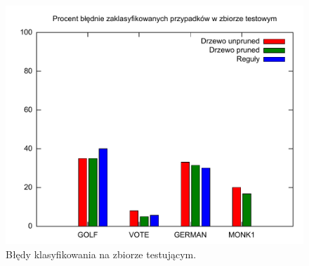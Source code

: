 \begin{figure}[hth]
	\includegraphics[scale=0.7]{figures/part2/task2/compare-errors.pdf} 
	\caption{Błędy klasyfikowania na zbiorze testującym.}
	\label{p2t2-compare-errors}
\end{figure}
